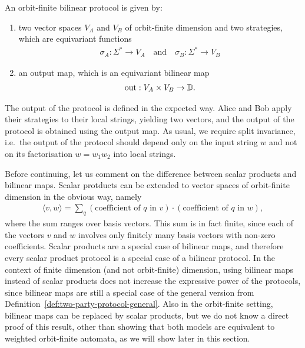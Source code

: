 \begin{definition}
    \label{def:orbit-finite-scalar-product-protocol}
    An orbit-finite bilinear protocol is given by:
    \begin{enumerate}
        \item two vector spaces $V_A$ and $V_B$ of orbit-finite dimension  and two strategies, which are  equivariant functions
        \begin{align*}
        \sigma_A : \Sigma^* \to V_A 
        \quad \text{and} \quad
        \sigma_B : \Sigma^* \to V_B
        \end{align*}
        \item an output map, which is an equivariant bilinear map 
        \begin{align*}
        \text{out} : V_A \times V_B \to \mathbb D.
        \end{align*}
    \end{enumerate}
\end{definition}
The output of the protocol is defined in the expected way. Alice and Bob apply their strategies to their local strings, yielding two vectors, and the output of the protocol is obtained using the output map. As usual, we require split invariance, i.e.~the output of the protocol should depend only on the input string $w$ and not on its factorisation $w = w_1 w_2$ into local strings. 

Before continuing, let us comment on the difference between scalar products and bilinear maps. Scalar protducts can be extended to vector spaces of orbit-finite dimension in the obvious way, namely
\begin{align*}
\langle v, w \rangle = \sum_{q} (\text{coefficient of $q$ in $v$}) \cdot ( \text{coefficient of $q$ in $w$}),
\end{align*}
where the sum ranges over basis vectors. This sum is in fact finite, since each of the vectors $v$ and $w$ involves only finitely many basis vectors with non-zero coefficients.
Scalar products are a special case of bilinear maps, and therefore every scalar product protocol is a special case of a bilinear protocol. In the context of finite dimension (and not orbit-finite) dimension, using bilinear maps instead of scalar products does not increase the expressive power of the protocols, since bilinear maps are still a special case of the general version from Definition~\ref{def:two-party-protocol-general}. Also in the orbit-finite setting, bilinear maps can be replaced by scalar products, but we do not know a direct proof of this result, other than showing that both models are equivalent to weighted orbit-finite automata, as we will show later in this section. 

